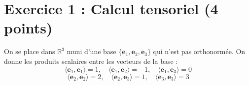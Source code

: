 \documentclass[12pt]{article}
\begin{document}
\section*{Exercice 1 : Calcul tensoriel (4 points)}

On se place dans $\mathbb{R}^3$ muni d'une base $\{\mathbf{e}_1, \mathbf{e}_2, \mathbf{e}_3\}$ qui n'est pas orthonormée. On donne les produits scalaires entre les vecteurs de la base :
\[
\langle \mathbf{e}_1, \mathbf{e}_1 \rangle = 1, \quad \langle \mathbf{e}_1, \mathbf{e}_2 \rangle = -1, \quad \langle \mathbf{e}_1, \mathbf{e}_3 \rangle = 0
\]
\[
\langle \mathbf{e}_2, \mathbf{e}_2 \rangle = 2, \quad \langle \mathbf{e}_2, \mathbf{e}_3 \rangle = 1, \quad \langle \mathbf{e}_3, \mathbf{e}_3 \rangle = 3
\]
\end{document}
